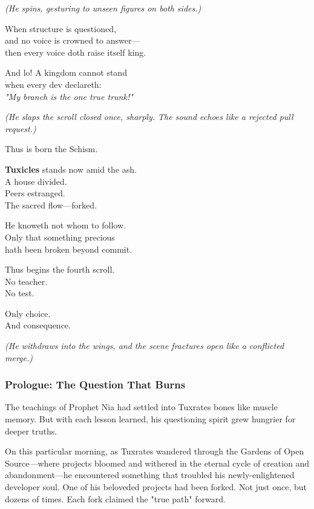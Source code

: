 \emph{(He spins, gesturing to unseen figures on both sides.)}

When structure is questioned,\\
and no voice is crowned to answer---\\
then every voice doth raise itself king.

And lo! A kingdom cannot stand\\
when every dev declareth:\\
\emph{"My branch is the one true trunk!"}

\emph{(He slaps the scroll closed once, sharply. The sound echoes like a rejected pull request.)}

Thus is born the Schism.

\textbf{Tuxicles} stands now amid the ash.\\
A house divided.\\
Peers estranged.\\
The sacred flow---forked.

He knoweth not whom to follow.\\
Only that something precious\\
hath been broken beyond commit.

Thus begins the fourth scroll.\\
No teacher.\\
No test.

Only choice.\\
And consequence.

\emph{(He withdraws into the wings, and the scene fractures open like a conflicted merge.)}

\bookdivider

\subsubsection{Prologue: The Question That Burns}\label{prologue-the-question-that-burns}

The teachings of Prophet Nia had settled into Tuxrates\textquotesingle{} bones like muscle memory. But with each lesson learned, his questioning spirit grew hungrier for deeper truths.

On this particular morning, as Tuxrates wandered through the Gardens of Open Source---where projects bloomed and withered in the eternal cycle of creation and abandonment---he encountered something that troubled his newly-enlightened developer soul. One of his beloveded projects had been forked. Not just once, but dozens of times. Each fork claimed the "true path" forward.

